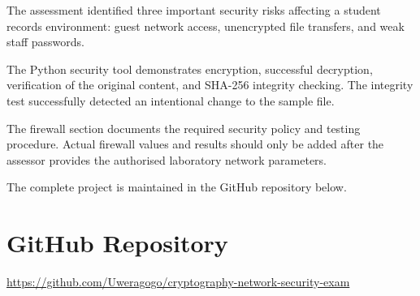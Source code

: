 \documentclass[12pt,a4paper]{article}
\begin{document}
The assessment identified three important security risks affecting a student records environment: guest network access, unencrypted file transfers, and weak staff passwords.

The Python security tool demonstrates encryption, successful decryption, verification of the original content, and SHA-256 integrity checking. The integrity test successfully detected an intentional change to the sample file.

The firewall section documents the required security policy and testing procedure. Actual firewall values and results should only be added after the assessor provides the authorised laboratory network parameters.

The complete project is maintained in the GitHub repository below.

\section*{GitHub Repository}

\url{https://github.com/Uweragogo/cryptography-network-security-exam}
\end{document}
